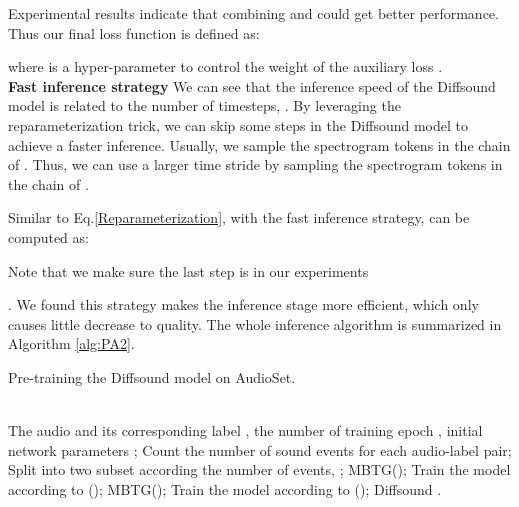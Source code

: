 \documentclass[lettersize,journal]{IEEEtran}
\begin{document}
Experimental results indicate that combining  and  could get better performance. Thus our final loss function is defined as:

where  is a hyper-parameter to control the weight of the auxiliary loss .\\
\textbf{Fast inference strategy} We can see that the inference speed of the Diffsound model is related to the number of timesteps, . By leveraging the reparameterization trick, we can skip some steps in the Diffsound model to achieve a faster inference. Usually, we sample the spectrogram tokens in the chain of . Thus, we can use a larger time stride  by sampling the spectrogram tokens in the chain of . 
{\color{black}Similar to Eq.\ref{Reparameterization}, with the fast inference strategy,   can be computed as:

{Note that we make sure the last step is  in our experiments}}. We found this strategy makes the inference stage more efficient, which only causes little decrease to quality. The whole inference algorithm is summarized in Algorithm \ref{alg:PA2}.\\
\begin{algorithm}[t]
\caption{Pre-training the Diffsound model on AudioSet.}
\label{alg:PA3}
\begin{algorithmic}[1]
\REQUIRE ~~\\
    The audio and its corresponding label , the number of training epoch , initial network parameters ;
    \STATE Count the number of sound events for each audio-label pair;
    \STATE Split  into two subset according the number of events, ;
    \STATE  MBTG();
    \STATE Train the model  according to ();
    \ENDFOR
    \ENDFOR
    \STATE  MBTG();
    \STATE Train the model  according to ();
    \ENDFOR
    \ENDFOR
\RETURN Diffsound .
\end{algorithmic}
\end{algorithm}
\end{document}
